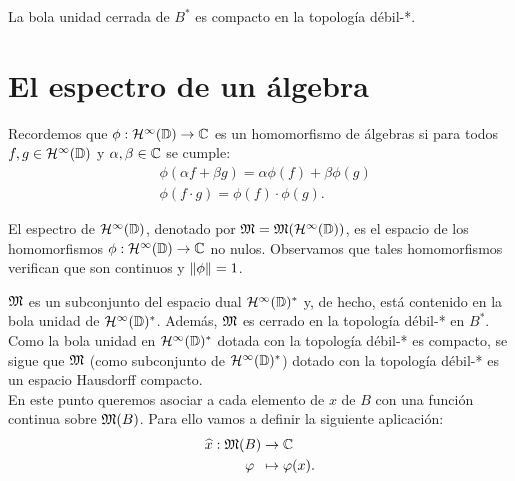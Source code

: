 \begin{theorem}[de Alaouglu]
    La bola unidad cerrada de $B^*$ es compacto en la topología débil-*.
\end{theorem}

\section{El espectro de un álgebra}

Recordemos que $\phi : \mathcal{H}^{\infty}(\mathbb{D}) \to \mathbb{C}$ es un homomorfismo de álgebras si para todos $f, g \in \mathcal{H}^{\infty}(\mathbb{D})$ y $\alpha, \beta \in \mathbb{C}$ se cumple:
\begin{equation}
    \begin{split}
        & \phi (\alpha f + \beta g) = \alpha \phi(f) + \beta \phi(g) \\
        & \phi(f \cdot g) = \phi(f) \cdot \phi(g).
    \end{split}
\end{equation}

El espectro de $\mathcal{H}^{\infty}(\mathbb{D})$, denotado por $\mathfrak{M} = \mathfrak{M} (\mathcal{H}^{\infty}(\mathbb{D}))$, es el espacio de los homomorfismos $\phi: \mathcal{H}^{\infty}(\mathbb{D}) \to \mathbb{C}$ no nulos. Observamos que tales homomorfismos verifican que son continuos y $\left\lVert\phi\right\rVert = 1$. \\


$\mathfrak{M}$ es un subconjunto del espacio dual $\mathcal{H}^{\infty}(\mathbb{D})^*$ y, de hecho, está contenido en la bola unidad de $\mathcal{H}^{\infty}(\mathbb{D})^*$. Además, $\mathfrak{M}$ es cerrado en la topología débil-* en $B^*$. \\

Como la bola unidad en $\mathcal{H}^{\infty}(\mathbb{D})^*$ dotada con la topología débil-* es compacto, se sigue que $\mathfrak{M}$ (como subconjunto de $\mathcal{H}^{\infty}(\mathbb{D})^*$) dotado con la topología débil-* es un espacio Hausdorff compacto. \\

En este punto queremos asociar a cada elemento de $x$ de $B$ con una función continua sobre $\mathfrak{M}(B)$. Para ello vamos a definir la siguiente aplicación:
\begin{equation*}
    \begin{split}
        \widehat x:  \mathfrak{M}(B) & \to  \mathbb{C} \\
                 \varphi \, \, \, & \mapsto  \varphi (x).
    \end{split}
\end{equation*}

